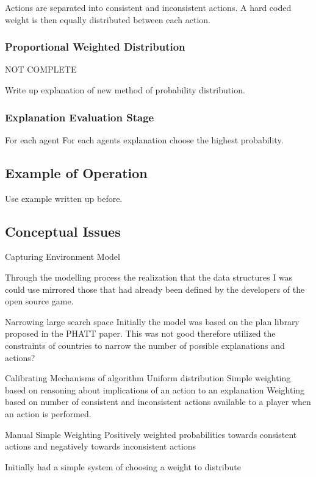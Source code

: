 \documentclass[parskip]{cs4rep}
\begin{document}
Actions are separated into consistent and inconsistent actions. A hard coded weight is then equally distributed between each action.

\subsubsection{Proportional Weighted Distribution}

NOT COMPLETE

Write up explanation of new method of probability distribution.

\subsubsection{Explanation Evaluation Stage}

For each agent
For each agents explanation choose the highest probability.

\subsection{Example of Operation}

Use example written up before.

\subsection{Conceptual Issues}

Capturing Environment Model

Through the modelling process the realization that the data structures I was  could use mirrored those that had already been defined by the developers of the open source game.

Narrowing large search space
Initially the model was based on the plan library proposed in the PHATT paper. This was not good therefore utilized the constraints of countries to narrow the number of possible explanations and actions?

Calibrating Mechanisms of algorithm
Uniform distribution
Simple weighting based on reasoning about implications of an action to an explanation
Weighting based on number of consistent and inconsistent actions available to a player when an action is performed.

Manual Simple Weighting
Positively weighted probabilities towards consistent actions and negatively towards inconsistent actions

Initially had a simple system of choosing a weight to distribute
\end{document}
